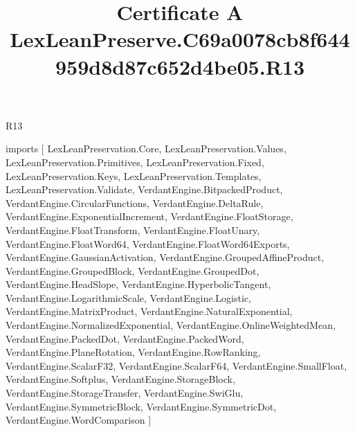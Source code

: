 \begin{lexlean}{R13}
\title{Certificate A LexLeanPreserve.C69a0078cb8f644959d8d87c652d4be05.R13}
\begin{coremodule}
imports [
  LexLeanPreservation.Core,
  LexLeanPreservation.Values,
  LexLeanPreservation.Primitives,
  LexLeanPreservation.Fixed,
  LexLeanPreservation.Keys,
  LexLeanPreservation.Templates,
  LexLeanPreservation.Validate,
  VerdantEngine.BitpackedProduct,
  VerdantEngine.CircularFunctions,
  VerdantEngine.DeltaRule,
  VerdantEngine.ExponentialIncrement,
  VerdantEngine.FloatStorage,
  VerdantEngine.FloatTransform,
  VerdantEngine.FloatUnary,
  VerdantEngine.FloatWord64,
  VerdantEngine.FloatWord64Exports,
  VerdantEngine.GaussianActivation,
  VerdantEngine.GroupedAffineProduct,
  VerdantEngine.GroupedBlock,
  VerdantEngine.GroupedDot,
  VerdantEngine.HeadSlope,
  VerdantEngine.HyperbolicTangent,
  VerdantEngine.LogarithmicScale,
  VerdantEngine.Logistic,
  VerdantEngine.MatrixProduct,
  VerdantEngine.NaturalExponential,
  VerdantEngine.NormalizedExponential,
  VerdantEngine.OnlineWeightedMean,
  VerdantEngine.PackedDot,
  VerdantEngine.PackedWord,
  VerdantEngine.PlaneRotation,
  VerdantEngine.RowRanking,
  VerdantEngine.ScalarF32,
  VerdantEngine.ScalarF64,
  VerdantEngine.SmallFloat,
  VerdantEngine.Softplus,
  VerdantEngine.StorageBlock,
  VerdantEngine.StorageTransfer,
  VerdantEngine.SwiGlu,
  VerdantEngine.SymmetricBlock,
  VerdantEngine.SymmetricDot,
  VerdantEngine.WordComparison
]


\end{coremodule}
\end{lexlean}
